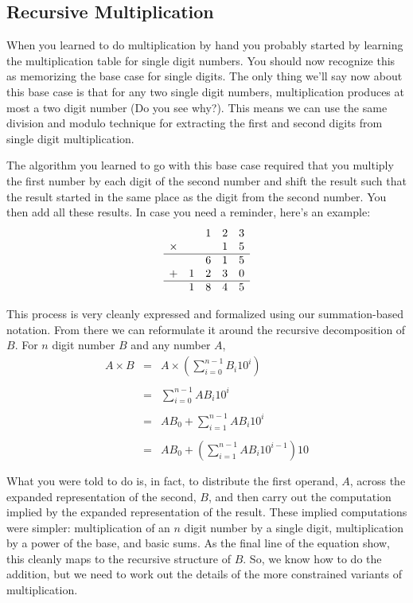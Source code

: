 \documentclass[10pt]{article}
\begin{document}
\subsection*{Recursive Multiplication}

When you learned to do multiplication by hand you probably started by learning the multiplication table for single digit numbers. You should now recognize this as memorizing the base case for single digits. The only thing we'll say now about this base case is that for any two single digit numbers, multiplication produces at most a two digit number (Do you see why?). This means we can use the same division and modulo technique for extracting the first and second digits from single digit multiplication. 

The algorithm you learned to go with this base case required that you multiply the first number by each digit of the second number and shift the result such that the result started in the same place as the digit from the second number. You then add all these results. In case you need a reminder, here's an example:
\[
\begin{array}{lllll}
 & &1&2&3 \\
\times & & &1&5 \\ \hline
 & &6 &1 &5 \\
+ &1 &2 &3 &0 \\ \hline
 &1 &8 &4 &5 
\end{array}
\]

This process is very cleanly expressed and formalized using our summation-based notation. From there we can reformulate it around the recursive decomposition of $B$. For $n$ digit number $B$ and any number $A$,
\[
\begin{array}{rcl}
A \times B &=& A \times \left(\sum\limits_{i=0}^{n-1}B_i10^i \right)\\ \\
 &=& \sum\limits_{i=0}^{n-1}AB_i10^i \\ \\
 &=& AB_0 + \sum\limits_{i=1}^{n-1}AB_i10^i \\ \\ 
 &=& AB_0 + \left(\sum\limits_{i=1}^{n-1}AB_i10^{i-1}\right)10 \\ \\ 
\end{array}
\] 
What you were told to do is, in fact, to distribute the first operand, $A$, across the expanded representation of the second, $B$, and then carry out the computation implied by the expanded representation of the result. These implied computations were simpler: multiplication of an $n$ digit number by a single digit, multiplication by a power of the base, and basic sums. As the final line of the equation show, this cleanly maps to the recursive structure of $B$. So, we know how to do the addition, but we need to work out the details of the more constrained variants of multiplication. 
\end{document}
